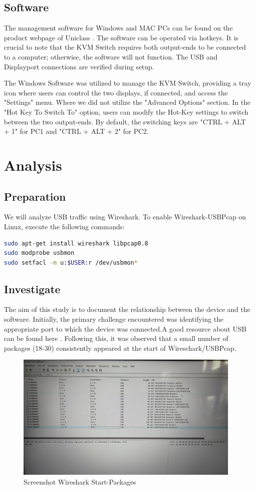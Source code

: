 \subsection{Software}
The management software for Windows and MAC PCs can be found on the product webpage of Uniclass \cite{Uniclass_Webpage}. The software can be operated via hotkeys. It is crucial to note that the KVM Switch requires both output-ends to be connected to a computer; otherwise, the software will not function. The USB and Displayport connections are verified during setup.

The Windows Software was utilized to manage the KVM Switch, providing a tray icon where users can control the two displays, if connected, and access the "Settings" menu. Where we did not utilize the "Advanced Options" section. In the "Hot Key To Switch To" option, users can modify the Hot-Key settings to switch between the two output-ends. By default, the switching keys are "CTRL + ALT + 1" for PC1 and "CTRL + ALT + 2" for PC2.


\section{Analysis}
\subsection{Preparation}
We will analyze USB traffic using Wireshark. To enable Wireshark-USBPcap on Linux, execute the following commands:
\begin{lstlisting}[language=Bash, basicstyle=\small]
sudo apt-get install wireshark libpcap0.8
sudo modprobe usbmon
sudo setfacl -m u:$USER:r /dev/usbmon*
\end{lstlisting}

\subsection{Investigate}
The aim of this study is to document the relationship between the device and the software. Initially, the primary challenge encountered was identifying the appropriate port to which the device was connected.A good resource about USB can be found here \cite{Beyond_Logic}. Following this, it was observed that a small number of packages (18-30) consistently appeared at the start of Wireschark/USBPcap.

\begin{figure}[htp!]
    \centering
    \includegraphics[width=11cm]{img/pre_sniff.jpg}
    \caption{Screenshot Wireshark Start-Packages}
    \label{fig:Screenshot Wireshark Start-Packages}
\end{figure}

